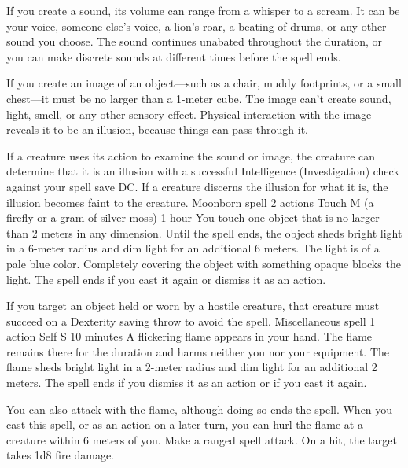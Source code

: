     If you create a sound, its volume can range from a whisper to a scream.
    It can be your voice, someone else's voice, a lion's roar, a beating of drums, or any other sound you choose.
    The sound continues unabated throughout the duration, or you can make discrete sounds at different times before the spell ends.

    If you create an image of an object---such as a chair, muddy footprints, or a small chest---it must be no larger than a 1-meter cube.
    The image can't create sound, light, smell, or any other sensory effect.
    Physical interaction with the image reveals it to be an illusion, because things can pass through it.

    If a creature uses its action to examine the sound or image, the creature can determine that it is an illusion with a successful Intelligence (Investigation) check against your spell save DC.
    If a creature discerns the illusion for what it is, the illusion becomes faint to the creature.
    {Moonborn spell}
    {2 actions}
    {Touch}
    {M (a firefly or a gram of silver moss)}
    {1 hour}
    You touch one object that is no larger than 2 meters in any dimension.
    Until the spell ends, the object sheds bright light in a 6-meter radius and dim light for an additional 6 meters.
    The light is of a pale blue color.
    Completely covering the object with something opaque blocks the light.
    The spell ends if you cast it again or dismiss it as an action.

    If you target an object held or worn by a hostile creature, that creature must succeed on a Dexterity saving throw to avoid the spell.
    {Miscellaneous spell}
    {1 action}
    {Self}
    {S}
    {10 minutes}
    A flickering flame appears in your hand.
    The flame remains there for the duration and harms neither you nor your equipment.
    The flame sheds bright light in a 2-meter radius and dim light for an additional 2 meters.
    The spell ends if you dismiss it as an action or if you cast it again.

    You can also attack with the flame, although doing so ends the spell.
    When you cast this spell, or as an action on a later turn, you can hurl the flame at a creature within 6 meters of you.
    Make a ranged spell attack.
    On a hit, the target takes 1d8 fire damage.

